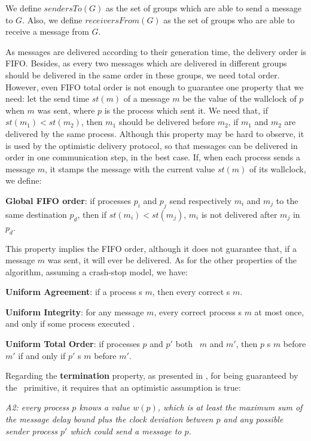 \documentclass[times, 10pt]{article}
\begin{document}
We define $sendersTo(G)$ as the set of groups which are able to send a message to $G$. Also, we define $receiversFrom(G)$ as the set of groups who are able to receive a message from $G$.

As messages are delivered according to their generation time, the delivery order is FIFO. Besides, as every two messages which are delivered in different groups should be delivered in the same order in these groups, we need total order. However, even FIFO total order is not enough to guarantee one property that we need: let the send time $st(m)$ of a message $m$ be the value of the wallclock of $p$ when $m$ was sent, where $p$ is the process which sent it. We need that, if $st(m_1) < st(m_2)$, then $m_1$ should be delivered before $m_2$, if $m_1$ and $m_2$ are delivered by the same process. Although this property may be hard to observe, it is used by the optimistic delivery protocol, so that messages can be delivered in order in one communication step, in the best case. If, when each process sends a message $m$, it stamps the message with the current value $st(m)$ of its wallclock, we define:

\textbf{Global FIFO order}: if processes $p_i$ and $p_j$ send respectively $m_i$ and $m_j$ to the same destination $p_d$, then if $st(m_i) < st(m_j)$, $m_i$ is not delivered after $m_j$ in $p_d$.

This property implies the FIFO order, although it does not guarantee that, if a message $m$ was sent, it will ever be delivered. As for the other properties of the algorithm, assuming a crash-stop model, we have:

\textbf{Uniform Agreement}: if a process \cons{}s $m$, then every correct %
\cons{}s $m$.

\textbf{Uniform Integrity}: for any message $m$, every correct process \cons{}s $m$ at most once, and only if some process executed .

\textbf{Uniform Total Order}: if processes $p$ and $p'$ both \cons\ $m$ and $m'$, then $p$ \cons{}s $m$ before $m'$ if and only if $p'$ \cons{}s $m$ before $m'$.

Regarding the \textbf{termination} property, as presented in \cite{rodrigues2000atomic}, for being guaranteed by the \cms\ primitive, it requires that an optimistic assumption is true:

\begin{center}
\emph{A2: every process $p$ knows a value $w(p)$, which is at least the maximum sum of the message delay bound plus the clock deviation between $p$ and any possible sender process $p'$ which could send a message to $p$.}
\end{center}
\end{document}
